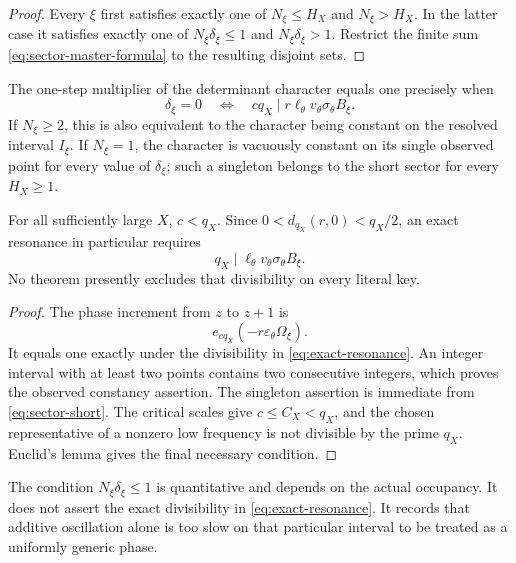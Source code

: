 \begin{proof}
Every \(\xi\) first satisfies exactly one of
\(N_\xi\le H_X\) and \(N_\xi>H_X\).  In the latter case it satisfies
exactly one of \(N_\xi\delta_\xi\le1\) and
\(N_\xi\delta_\xi>1\).  Restrict the finite sum
\eqref{eq:sector-master-formula} to the resulting disjoint sets.
\end{proof}

\begin{proposition}
\label{prop:exact-resonance}
The one-step multiplier of the determinant character equals one
precisely when
\begin{equation}
 \delta_\xi=0
 \quad\Longleftrightarrow\quad
 cq_X\mid r\ell_\theta v_\theta
 \sigma_\theta B_\xi.
\label{eq:exact-resonance}
\end{equation}
If \(N_\xi\ge2\), this is also equivalent to the character being
constant on the resolved interval \(I_\xi\).  If \(N_\xi=1\), the
character is vacuously constant on its single observed point for
every value of \(\delta_\xi\); such a singleton belongs to the short
sector for every \(H_X\ge1\).

For all sufficiently large \(X\), \(c<q_X\).  Since
\(0<d_{q_X}(r,0)<q_X/2\), an exact resonance in particular requires
\[
 q_X\mid
 \ell_\theta v_\theta\sigma_\theta B_\xi.
\]
No theorem presently excludes that divisibility on every literal
key.
\end{proposition}

\begin{proof}
The phase increment from \(z\) to \(z+1\) is
\[
 e_{cq_X}(-r\varepsilon_\theta\Omega_\xi).
\]
It equals one exactly under the divisibility in
\eqref{eq:exact-resonance}.  An integer interval with at least two
points contains two consecutive integers, which proves the observed
constancy assertion.  The singleton assertion is immediate from
\eqref{eq:sector-short}.  The critical scales give
\(c\le C_X<q_X\), and the chosen representative of a nonzero
low frequency is not divisible by the prime \(q_X\).  Euclid's lemma
gives the final necessary condition.
\end{proof}

\begin{remark}
The condition \(N_\xi\delta_\xi\le1\) is quantitative and depends on
the actual occupancy.  It does not assert the exact divisibility in
\eqref{eq:exact-resonance}.  It records that additive oscillation
alone is too slow on that particular interval to be treated as a
uniformly generic phase.
\end{remark}

